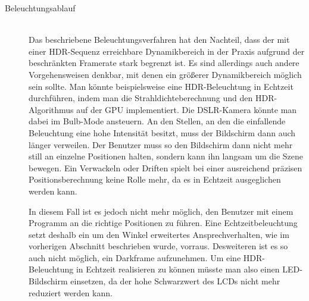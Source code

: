 \begin{description}
   \item[Beleuchtungsablauf] \hfill \\
    Das beschriebene Beleuchtungsverfahren hat den Nachteil, dass der mit einer HDR-Sequenz erreichbare Dynamikbereich in der Praxis aufgrund  der beschränkten Framerate stark begrenzt ist.
    Es sind allerdings auch andere Vorgehensweisen denkbar, mit denen ein größerer Dynamikbereich möglich sein sollte.
    Man könnte beispielsweise eine HDR-Beleuchtung in Echtzeit durchführen, indem man die Strahldichteberechnung und den HDR-Algorithmus auf der GPU implementiert. 
    Die DSLR-Kamera könnte man dabei im Bulb-Mode ansteuern.
    An den Stellen, an den die einfallende Beleuchtung eine hohe Intensität besitzt, muss der Bildschirm dann auch länger verweilen.
    Der Benutzer muss so den Bildschirm dann nicht mehr still an einzelne Positionen halten, sondern kann ihn langsam um die Szene bewegen. 
    Ein Verwackeln oder Driften spielt bei einer ausreichend präzisen Positionsberechnung keine Rolle mehr, da es in Echtzeit ausgeglichen werden kann.
 
    In diesem Fall ist es jedoch nicht mehr möglich, den Benutzer  mit einem  Programm an die richtige Positionen zu führen.
    Eine Echtzeitbeleuchtung setzt deshalb ein um den Winkel erweitertes Ansprechverhalten, wie im vorherigen Abschnitt beschrieben wurde, vorraus.
    Desweiteren ist es so auch nicht möglich, ein Darkframe aufzunehmen.
    Um eine HDR-Beleuchtung in Echtzeit realisieren zu können müsste man also einen LED-Bildschirm einsetzen, da der hohe Schwarzwert des LCDs nicht mehr reduziert werden kann.
    
  \end{description}
